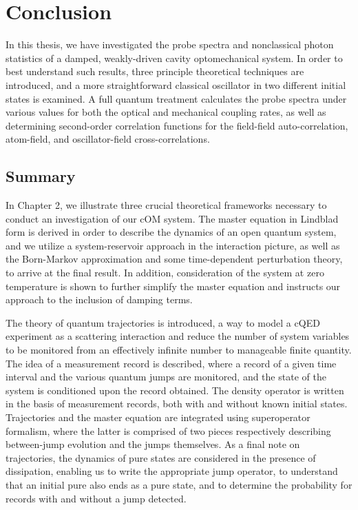 \chapter{Conclusion}
In this thesis, we have investigated the probe spectra and nonclassical photon statistics of a damped, weakly-driven cavity optomechanical system. In order to best understand such results, three principle theoretical techniques are introduced, and a more straightforward classical oscillator in two different initial states is examined. A full quantum treatment calculates the probe spectra under various values for both the optical and mechanical coupling rates, as well as determining second-order correlation functions for the field-field auto-correlation, atom-field, and oscillator-field cross-correlations.

\section{Summary}
In Chapter 2, we illustrate three crucial theoretical frameworks necessary to conduct an investigation of our cOM system. The master equation in Lindblad form is derived in order to describe the dynamics of an open quantum system, and we utilize a system-reservoir approach in the interaction picture, as well as the Born-Markov approximation and some time-dependent perturbation theory, to arrive at the final result. In addition, consideration of the system at zero temperature is shown to further simplify the master equation and instructs our approach to the inclusion of damping terms.

The theory of quantum trajectories is introduced, a way to model a cQED experiment as a scattering interaction and reduce the number of system variables to be monitored from an effectively infinite number to manageable finite quantity. The idea of a measurement record is described, where a record of a given time interval and the various quantum jumps are monitored, and the state of the system is conditioned upon the record obtained. The density operator is written in the basis of measurement records, both with and without known initial states. Trajectories and the master equation are integrated using superoperator formalism, where the latter is comprised of two pieces respectively describing between-jump evolution and the jumps themselves. As a final note on trajectories, the dynamics of pure states are considered in the presence of dissipation, enabling us to write the appropriate jump operator, to understand that an initial pure also ends as a pure state, and to determine the probability for records with and without a jump detected.

